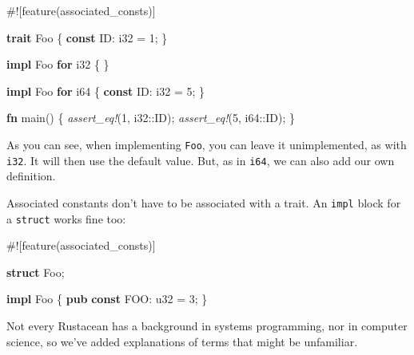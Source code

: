 \documentclass[a4paper,]{book}
\newenvironment{Shaded}{\begin{snugshade}}{\end{snugshade}}
\newcommand{\KeywordTok}[1]{\textcolor[rgb]{0.13,0.29,0.53}{\textbf{{#1}}}}
\newcommand{\DataTypeTok}[1]{\textcolor[rgb]{0.13,0.29,0.53}{{#1}}}
\newcommand{\DecValTok}[1]{\textcolor[rgb]{0.00,0.00,0.81}{{#1}}}
\newcommand{\PreprocessorTok}[1]{\textcolor[rgb]{0.56,0.35,0.01}{\textit{{#1}}}}
\newcommand{\AttributeTok}[1]{\textcolor[rgb]{0.77,0.63,0.00}{{#1}}}
\newcommand{\NormalTok}[1]{{#1}}
\begin{document}
\begin{Shaded}
\begin{Highlighting}[]
\AttributeTok{#![}\NormalTok{feature}\AttributeTok{(}\NormalTok{associated_consts}\AttributeTok{)]}

\KeywordTok{trait} \NormalTok{Foo \{}
    \KeywordTok{const} \NormalTok{ID: }\DataTypeTok{i32} \NormalTok{= }\DecValTok{1}\NormalTok{;}
\NormalTok{\}}

\KeywordTok{impl} \NormalTok{Foo }\KeywordTok{for} \DataTypeTok{i32} \NormalTok{\{}
\NormalTok{\}}

\KeywordTok{impl} \NormalTok{Foo }\KeywordTok{for} \DataTypeTok{i64} \NormalTok{\{}
    \KeywordTok{const} \NormalTok{ID: }\DataTypeTok{i32} \NormalTok{= }\DecValTok{5}\NormalTok{;}
\NormalTok{\}}

\KeywordTok{fn} \NormalTok{main() \{}
    \PreprocessorTok{assert_eq!}\NormalTok{(}\DecValTok{1}\NormalTok{, }\DataTypeTok{i32}\NormalTok{::ID);}
    \PreprocessorTok{assert_eq!}\NormalTok{(}\DecValTok{5}\NormalTok{, }\DataTypeTok{i64}\NormalTok{::ID);}
\NormalTok{\}}
\end{Highlighting}
\end{Shaded}

As you can see, when implementing \texttt{Foo}, you can leave it
unimplemented, as with \texttt{i32}. It will then use the default value.
But, as in \texttt{i64}, we can also add our own definition.

Associated constants don't have to be associated with a trait. An
\texttt{impl} block for a \texttt{struct} works fine too:

\begin{Shaded}
\begin{Highlighting}[]
\AttributeTok{#![}\NormalTok{feature}\AttributeTok{(}\NormalTok{associated_consts}\AttributeTok{)]}

\KeywordTok{struct} \NormalTok{Foo;}

\KeywordTok{impl} \NormalTok{Foo \{}
    \KeywordTok{pub} \KeywordTok{const} \NormalTok{FOO: }\DataTypeTok{u32} \NormalTok{= }\DecValTok{3}\NormalTok{;}
\NormalTok{\}}
\end{Highlighting}
\end{Shaded}


Not every Rustacean has a background in systems programming, nor in
computer science, so we've added explanations of terms that might be
unfamiliar.
\end{document}
